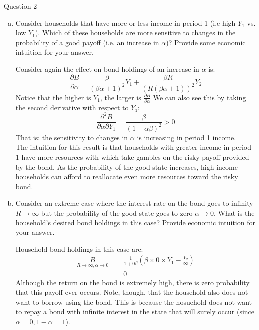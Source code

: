 \documentclass[a4paper]{article}
\begin{document}
\begin{questionbox}{Question 2}
\begin{enumerate}[(a)]
\begin{explanationbox}
				\end{explanationbox}
				\item Consider households that have more or less income in period 1 (i.e high \( Y_1 \) vs. low \( Y_1 \)). Which of these households are more sensitive to changes in the probability of a good payoﬀ (i.e. an increase in \( \alpha \))? Provide some economic intuition for your answer.
				\begin{explanationbox}
					Consider again the eﬀect on bond holdings of an increase in \( \alpha \) is:
					\[
						\frac{\partial B}{\partial \alpha} = \frac{\beta}{(\beta\alpha+1)^2}Y_1 + \frac{\beta R}{(R(\beta\alpha + 1))^2}Y_2
					\]
					Notice that the higher is \( Y_1 \), the larger is \( \frac{\partial B}{\partial \alpha} \) We can also see this by taking the second derivative with respect to \( Y_1 \):
					\[
						\frac{\partial^2 B}{\partial \alpha \partial Y_1} = \frac{\beta}{(1+\alpha\beta)^2} > 0
					\]
					That is: the sensitivity to changes in \( \alpha \) is increasing in period 1 income.\\
					The intuition for this result is that households with greater income in period 1 have more resources with which take gambles on the risky payoﬀ provided by the bond. As the probability of the good state increases, high income households can aﬀord to reallocate even more resources toward the risky bond.
				\end{explanationbox}
				\item Consider an extreme case where the interest rate on the bond goes to inﬁnity \( R \rightarrow \infty \) but the probability of the good state goes to zero \( \alpha \rightarrow 0 \). What is the household’s desired bond holdings in this case? Provide economic intuition for your answer.
				\begin{explanationbox}
					Household bond holdings in this case are:
					\begin{align*}
						\underset{R \rightarrow \infty,\alpha \rightarrow 0}{B} &= \frac{1}{1+0\beta} \left( \beta \times 0 \times Y_1 - \frac{Y_2}{\infty} \right) \\
						&= 0
					\end{align*}
					Although the return on the bond is extremely high, there is zero probability that this payoﬀ ever occurs. Note, though, that the household also does not want to borrow using the bond. This is because the hosuehold does not want to repay a bond with inﬁnite interest in the state that will surely occur (since \( \alpha = 0, 1 - \alpha = 1 \)).
				\end{explanationbox}
			\end{enumerate}
	\end{questionbox}
\end{document}
